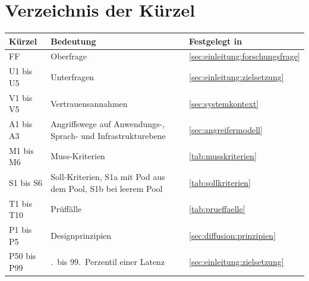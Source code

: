 \section*{Verzeichnis der Kürzel}

\begin{tabularx}{\textwidth}{@{}l >{\RaggedRight\arraybackslash}X l@{}}
  \hline
  Kürzel & Bedeutung & Festgelegt in \\
  \hline
  FF & Oberfrage & \autoref{sec:einleitung:forschungsfrage} \\
  U1 bis U5 & Unterfragen & \autoref{sec:einleitung:zielsetzung} \\
  V1 bis V5 & Vertrauensannahmen & \autoref{sec:systemkontext} \\
  A1 bis A3 & Angriffswege auf Anwendungs-, Sprach- und Infrastrukturebene & \autoref{sec:angreifermodell} \\
  M1 bis M6 & Muss-Kriterien & \autoref{tab:musskriterien} \\
  S1 bis S6 & Soll-Kriterien, S1a mit Pod aus dem Pool, S1b bei leerem Pool & \autoref{tab:sollkriterien} \\
  T1 bis T10 & Prüffälle & \autoref{tab:prueffaelle} \\
  P1 bis P5 & Designprinzipien & \autoref{sec:diffusion:prinzipien} \\
  P50 bis P99 & 50.\ bis 99.\ Perzentil einer Latenz & \autoref{sec:einleitung:zielsetzung} \\
  \hline
\end{tabularx}
